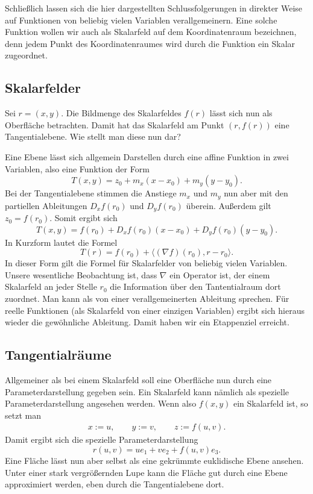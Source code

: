 \documentclass[a4paper,12pt,fleqn]{article}
\begin{document}
Schließlich lassen sich die hier dargestellten Schlussfolgerungen
in direkter Weise auf Funktionen von beliebig vielen Variablen
verallgemeinern. Eine solche Funktion wollen wir auch als Skalarfeld
auf dem Koordinatenraum bezeichnen, denn jedem Punkt des
Koordinatenraumes wird durch die Funktion ein Skalar zugeordnet.

\subsection{Skalarfelder}
Sei \(r=(x,y)\). Die Bildmenge des Skalarfeldes \(f(r)\) lässt sich
nun als Oberfläche betrachten. Damit hat das Skalarfeld am
Punkt \((r,f(r))\) eine Tangentialebene. Wie stellt man diese
nun dar? 

Eine Ebene lässt sich allgemein Darstellen durch
eine affine Funktion in zwei Variablen, also eine Funktion der
Form
\[T(x,y) = z_0 + m_x (x-x_0)+ m_y (y-y_0).\]
Bei der Tangentialebene stimmen die Anstiege \(m_x\) und \(m_y\)
nun aber mit den partiellen Ableitungen \(D_x f(r_0)\) und \(D_y f(r_0)\)
überein. Außerdem gilt \(z_0=f(r_0)\). Somit ergibt sich
\begin{equation}
T(x,y) = f(r_0)+D_xf(r_0)(x-x_0)+D_y f(r_0)(y-y_0).
\end{equation}
In Kurzform lautet die Formel
\begin{equation}
T(r) = f(r_0)+\langle (\nabla f)(r_0),r-r_0\rangle.
\end{equation}
In dieser Form gilt die Formel für Skalarfelder von beliebig
vielen Variablen. Unsere wesentliche Beobachtung ist, dass
\(\nabla\) ein Operator ist, der einem Skalarfeld an jeder Stelle
\(r_0\) die Information über den Tantentialraum dort zuordnet.
Man kann als von einer verallgemeinerten Ableitung sprechen. Für
reelle Funktionen (als Skalarfeld von einer einzigen Variablen)
ergibt sich hieraus wieder die gewöhnliche Ableitung.
Damit haben wir ein Etappenziel erreicht.

\subsection{Tangentialräume}

Allgemeiner als bei einem Skalarfeld soll eine Oberfläche nun
durch eine Parameterdarstellung gegeben sein. Ein Skalarfeld kann
nämlich als spezielle Parameterdarstellung angesehen werden.
Wenn also \(f(x,y)\) ein Skalarfeld ist, so setzt man
\begin{gather*}
x:=u,\qquad y:=v,\qquad z:=f(u,v).
\end{gather*}
Damit ergibt sich die spezielle Parameterdarstellung
\begin{equation}
r(u,v) = ue_1+ve_2+f(u,v)e_3.
\end{equation}
Eine Fläche lässt nun aber selbst als eine gekrümmte euklidische
Ebene ansehen. Unter einer stark vergrößernden Lupe kann die
Fläche gut durch eine Ebene approximiert werden, eben durch die
Tangentialebene dort.
\end{document}

